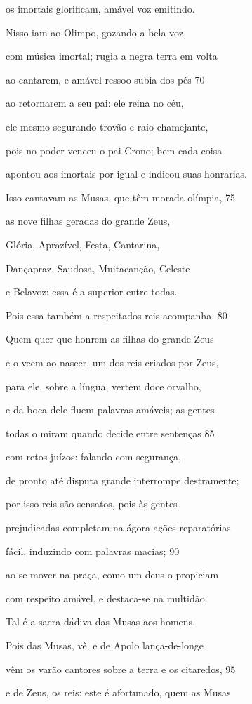 os imortais glorificam, amável voz emitindo.

Nisso iam ao Olimpo, gozando a bela voz,

com música imortal; rugia a negra terra em volta

ao cantarem, e amável ressoo subia dos pés \num{70}

ao retornarem a seu pai: ele reina no céu,

ele mesmo segurando trovão e raio chamejante,

pois no poder venceu o pai Crono; bem cada coisa

apontou aos imortais por igual e indicou suas honrarias.

\quad{}Isso cantavam as Musas, que têm morada olímpia, \num{75}

as nove filhas geradas do grande Zeus,

Glória, Aprazível, Festa, Cantarina,

Dançapraz, Saudosa, Muitacanção, Celeste

e Belavoz: essa é a superior entre todas.

Pois essa também a respeitados reis acompanha. \num{80}

Quem quer que honrem as filhas do grande Zeus

e o veem ao nascer, um dos reis criados por Zeus,

para ele, sobre a língua, vertem doce orvalho,

e da boca dele fluem palavras amáveis; as gentes

todas o miram quando decide entre sentenças \num{85}

com retos juízos: falando com segurança,

de pronto até disputa grande interrompe destramente;

por isso reis são sensatos, pois às gentes

prejudicadas completam na ágora ações reparatórias

fácil, induzindo com palavras macias; \num{90}

ao se mover na praça, como um deus o propiciam

com respeito amável, e destaca-se na multidão.

\quad{}Tal é a sacra dádiva das Musas aos homens.

Pois das Musas, vê, e de Apolo lança-de-longe

vêm os varão cantores sobre a terra e os citaredos, \num{95}

e de Zeus, os reis: este é afortunado, quem as Musas

